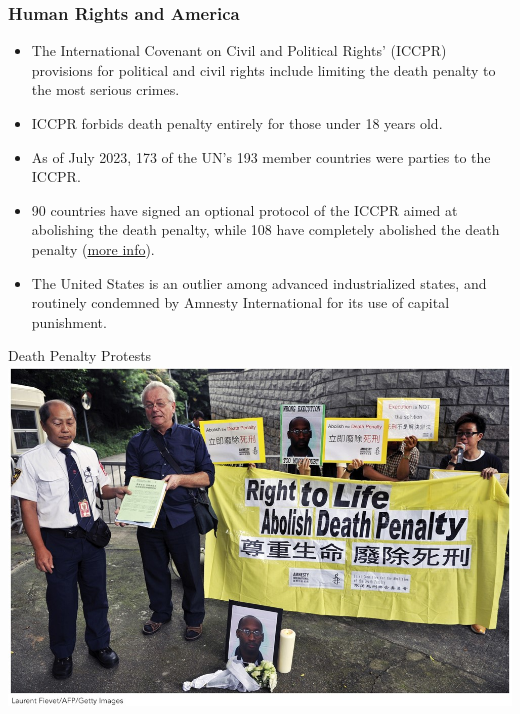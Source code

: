 \documentclass[handout]{beamer}
\begin{document}
\begin{frame} 
	\frametitle{\LARGE{Human Rights and America}}
	\begin{itemize}
		\item The International Covenant on Civil and Political Rights’ (ICCPR) provisions for political and civil rights include limiting the death penalty to the most serious crimes. \pause
		\item ICCPR forbids death penalty entirely for those under 18 years old. \pause
		\item As of July 2023, 173 of the UN’s 193 member countries were parties to the ICCPR.
		\item 90 countries have signed an optional protocol of the ICCPR aimed at abolishing the death penalty, while 108 have completely abolished the death penalty (\href{https://www.aljazeera.com/news/2022/10/10/infographic-which-countries-still-have-the-death-penalty-2}{more info}). \pause
		\item The United States is an outlier among advanced industrialized states, and routinely condemned by Amnesty International for its use of capital punishment. 
	\end{itemize}
\end{frame}

\begin{frame}{\LARGE Death Penalty Protests}
	\centering
	\includegraphics[width=\textwidth,height=0.9\textheight,keepaspectratio]{hongkongprotests.jpg}
\end{frame}
\end{document}
